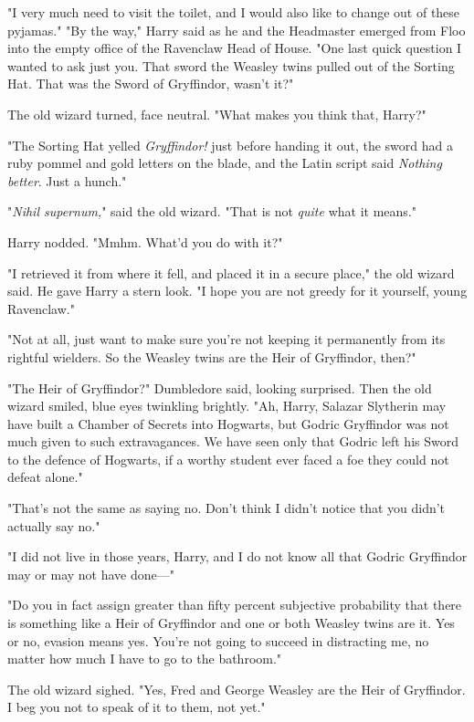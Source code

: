 "I very much need to visit the toilet, and I would also like to change out of
these pyjamas."
\later
"By the way," Harry said as he and the Headmaster emerged from Floo into the
empty office of the Ravenclaw Head of House. "One last quick question I wanted
to ask just you. That sword the Weasley twins pulled out of the Sorting Hat.
That was the Sword of Gryffindor, wasn't it?"

The old wizard turned, face neutral. "What makes you think that, Harry?"

"The Sorting Hat yelled \emph{Gryffindor!} just before handing it out, the
sword had a ruby pommel and gold letters on the blade, and the Latin script
said \emph{Nothing better}. Just a hunch."

"\emph{Nihil supernum,}" said the old wizard. "That is not \emph{quite} what it
means."

Harry nodded. "Mmhm. What'd you do with it?"

"I retrieved it from where it fell, and placed it in a secure place," the old
wizard said. He gave Harry a stern look. "I hope you are not greedy for it
yourself, young Ravenclaw."

"Not at all, just want to make sure you're not keeping it permanently from its
rightful wielders. So the Weasley twins are the Heir of Gryffindor, then?"

"The Heir of Gryffindor?" Dumbledore said, looking surprised. Then the old
wizard smiled, blue eyes twinkling brightly. "Ah, Harry, Salazar Slytherin may
have built a Chamber of Secrets into Hogwarts, but Godric Gryffindor was not
much given to such extravagances. We have seen only that Godric left his Sword
to the defence of Hogwarts, if a worthy student ever faced a foe they could not
defeat alone."

"That's not the same as saying no. Don't think I didn't notice that you didn't
actually say no."

"I did not live in those years, Harry, and I do not know all that Godric
Gryffindor may or may not have done---"

"Do you in fact assign greater than fifty percent subjective probability that
there is something like a Heir of Gryffindor and one or both Weasley twins are
it. Yes or no, evasion means yes. You're not going to succeed in distracting
me, no matter how much I have to go to the bathroom."

The old wizard sighed. "Yes, Fred and George Weasley are the Heir of
Gryffindor. I beg you not to speak of it to them, not yet."


